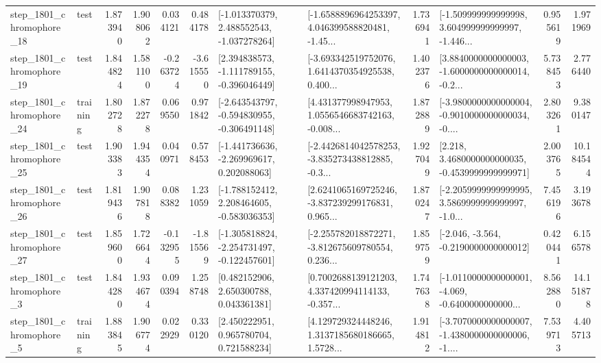 \begin{tabular}{llrrrrllrlrr}
 step\_1801\_chromophore\_18 &      test &      1.873940 &    1.908062 &      0.034121 &  0.484178 &   [-1.013370379, 2.488552543, -1.037278264] &  [-1.6588896964253397, 4.046399588820481, -1.45... &       1.736941 &  [-1.509999999999998, 3.604999999999997, -1.446... &            0.955619 &          1.971969 \\
 step\_1801\_chromophore\_19 &      test &      1.844824 &    1.581100 &     -0.263724 & -3.615550 &   [2.394838573, -1.111789155, -0.396046449] &  [-3.693342519752076, 1.6414370354925538, 0.400... &       1.402376 &  [3.8840000000000003, -1.6000000000000014, -0.2... &            5.738453 &          2.776440 \\
 step\_1801\_chromophore\_24 &  training &      1.802728 &    1.872278 &      0.069550 &  0.971842 &  [-2.643543797, -0.594830955, -0.306491148] &  [4.431377998947953, 1.0556546683742163, -0.008... &       1.872889 &  [-3.9800000000000004, -0.9010000000000034, -0.... &            2.803261 &          9.380147 \\
 step\_1801\_chromophore\_25 &      test &      1.903383 &    1.944354 &      0.040971 &  0.578453 &   [-1.441736636, -2.269969617, 0.202088063] &  [-2.4426814042578253, -3.835273438812885, -0.3... &       1.927049 &   [2.218, 3.4680000000000035, -0.4539999999999971] &            2.003765 &         10.184544 \\
 step\_1801\_chromophore\_26 &      test &      1.819436 &    1.907818 &      0.088382 &  1.231059 &   [-1.788152412, 2.208464605, -0.583036353] &  [2.6241065169725246, -3.837239299176831, 0.965... &       1.870247 &  [-2.2059999999999995, 3.5869999999999997, -1.0... &            7.456196 &          3.193678 \\
 step\_1801\_chromophore\_27 &      test &      1.859600 &    1.726644 &     -0.132955 & -1.815569 &  [-1.305818824, -2.254731497, -0.122457601] &  [-2.255782018872271, -3.812675609780554, 0.236... &       1.859759 &              [-2.046, -3.564, -0.2190000000000012] &            0.420441 &          6.156578 \\
  step\_1801\_chromophore\_3 &      test &      1.844280 &    1.934674 &      0.090394 &  1.258748 &     [0.482152906, 2.650300788, 0.043361381] &  [0.7002688139121203, 4.337420994114133, -0.357... &       1.747638 &  [-1.0110000000000001, -4.069, -0.6400000000000... &            8.562880 &         14.151878 \\
  step\_1801\_chromophore\_5 &  training &      1.883845 &    1.906774 &      0.022929 &  0.330120 &     [2.450222951, 0.965780704, 0.721588234] &  [4.129729324448246, 1.3137185680186665, 1.5728... &       1.914812 &  [-3.7070000000000007, -1.4380000000000006, -1.... &            7.539713 &          4.405713 \\

\end{tabular}
